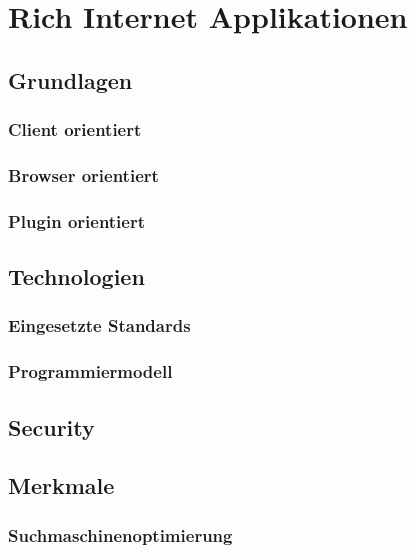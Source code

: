 \documentclass[
11pt, %
a4paper, %
BCOR25mm, %
DIV14, %
footsepline = false, %
headsepline, %
twoside, %
openright,
abstracton, %
listof=totocnumbered, %
bibliography=totocnumbered %
]{scrreprt}
\begin{document}
   
  \chapter{Rich Internet Applikationen}
  
  \section{Grundlagen}
  
  \subsection{Client orientiert}

  \subsection{Browser orientiert}
  
  \subsection{Plugin orientiert}
  
  \section{Technologien}
  
  \subsection{Eingesetzte Standards}
  
  \subsection{Programmiermodell}
  
  \section{Security}
  
  \section{Merkmale}
    
  \subsection{Suchmaschinenoptimierung}
  
\end{document}
